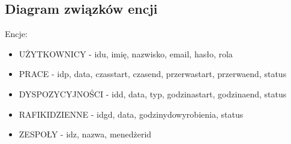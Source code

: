\subsection{Diagram związków encji}
Encje:
\begin{itemize}
    \item UŻYTKOWNICY - id\textunderscore{}u, imię, nazwisko, email, hasło, rola
    \item PRACE - id\textunderscore{}p, data, czas\textunderscore{}start, czas\textunderscore{}end, przerwa\textunderscore{}start, przerwa\textunderscore{}end, status
    \item DYSPOZYCYJNOŚCI - id\textunderscore{}d, data, typ, godzina\textunderscore{}start, godzina\textunderscore{}end, status
    \item RAFIKI\textunderscore{}DZIENNE - id\textunderscore{}gd, data, godziny\textunderscore{}do\textunderscore{}wyrobienia, status
    \item ZESPOŁY - id\textunderscore{}z, nazwa, menedżer\textunderscore{}id
\end{itemize}